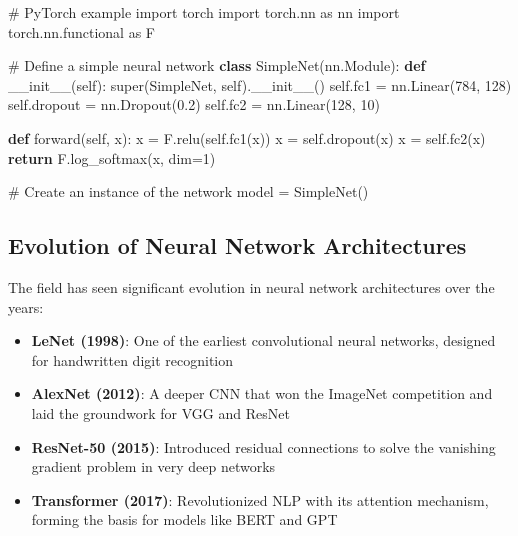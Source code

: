 \documentclass[
  letterpaper,
  DIV=11,
  numbers=noendperiod]{scrreprt}
\newenvironment{Shaded}{\begin{snugshade}}{\end{snugshade}}
\newcommand{\BuiltInTok}[1]{\textcolor[rgb]{0.00,0.23,0.31}{#1}}
\newcommand{\CommentTok}[1]{\textcolor[rgb]{0.37,0.37,0.37}{#1}}
\newcommand{\ControlFlowTok}[1]{\textcolor[rgb]{0.00,0.23,0.31}{\textbf{#1}}}
\newcommand{\DecValTok}[1]{\textcolor[rgb]{0.68,0.00,0.00}{#1}}
\newcommand{\FloatTok}[1]{\textcolor[rgb]{0.68,0.00,0.00}{#1}}
\newcommand{\FunctionTok}[1]{\textcolor[rgb]{0.28,0.35,0.67}{#1}}
\newcommand{\ImportTok}[1]{\textcolor[rgb]{0.00,0.46,0.62}{#1}}
\newcommand{\KeywordTok}[1]{\textcolor[rgb]{0.00,0.23,0.31}{\textbf{#1}}}
\newcommand{\NormalTok}[1]{\textcolor[rgb]{0.00,0.23,0.31}{#1}}
\newcommand{\OperatorTok}[1]{\textcolor[rgb]{0.37,0.37,0.37}{#1}}
\newcommand{\VariableTok}[1]{\textcolor[rgb]{0.07,0.07,0.07}{#1}}
\providecommand{\tightlist}{%
  \setlength{\itemsep}{0pt}\setlength{\parskip}{0pt}}\usepackage{longtable,booktabs,array}
\begin{document}
\begin{Shaded}
\begin{Highlighting}[]
\CommentTok{\# PyTorch example}
\ImportTok{import}\NormalTok{ torch}
\ImportTok{import}\NormalTok{ torch.nn }\ImportTok{as}\NormalTok{ nn}
\ImportTok{import}\NormalTok{ torch.nn.functional }\ImportTok{as}\NormalTok{ F}

\CommentTok{\# Define a simple neural network}
\KeywordTok{class}\NormalTok{ SimpleNet(nn.Module):}
    \KeywordTok{def} \FunctionTok{\_\_init\_\_}\NormalTok{(}\VariableTok{self}\NormalTok{):}
        \BuiltInTok{super}\NormalTok{(SimpleNet, }\VariableTok{self}\NormalTok{).}\FunctionTok{\_\_init\_\_}\NormalTok{()}
        \VariableTok{self}\NormalTok{.fc1 }\OperatorTok{=}\NormalTok{ nn.Linear(}\DecValTok{784}\NormalTok{, }\DecValTok{128}\NormalTok{)}
        \VariableTok{self}\NormalTok{.dropout }\OperatorTok{=}\NormalTok{ nn.Dropout(}\FloatTok{0.2}\NormalTok{)}
        \VariableTok{self}\NormalTok{.fc2 }\OperatorTok{=}\NormalTok{ nn.Linear(}\DecValTok{128}\NormalTok{, }\DecValTok{10}\NormalTok{)}
        
    \KeywordTok{def}\NormalTok{ forward(}\VariableTok{self}\NormalTok{, x):}
\NormalTok{        x }\OperatorTok{=}\NormalTok{ F.relu(}\VariableTok{self}\NormalTok{.fc1(x))}
\NormalTok{        x }\OperatorTok{=} \VariableTok{self}\NormalTok{.dropout(x)}
\NormalTok{        x }\OperatorTok{=} \VariableTok{self}\NormalTok{.fc2(x)}
        \ControlFlowTok{return}\NormalTok{ F.log\_softmax(x, dim}\OperatorTok{=}\DecValTok{1}\NormalTok{)}

\CommentTok{\# Create an instance of the network}
\NormalTok{model }\OperatorTok{=}\NormalTok{ SimpleNet()}
\end{Highlighting}
\end{Shaded}

\subsection{Evolution of Neural Network
Architectures}\label{evolution-of-neural-network-architectures}

The field has seen significant evolution in neural network architectures
over the years:

\begin{itemize}
\tightlist
\item
  \textbf{LeNet (1998)}: One of the earliest convolutional neural
  networks, designed for handwritten digit recognition
\item
  \textbf{AlexNet (2012)}: A deeper CNN that won the ImageNet
  competition and laid the groundwork for VGG and ResNet
\item
  \textbf{ResNet-50 (2015)}: Introduced residual connections to solve
  the vanishing gradient problem in very deep networks
\item
  \textbf{Transformer (2017)}: Revolutionized NLP with its attention
  mechanism, forming the basis for models like BERT and GPT
\end{itemize}
\end{document}

